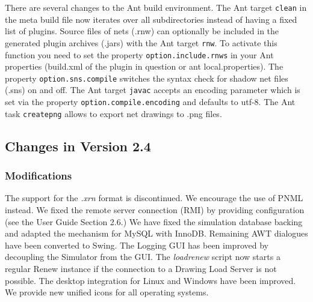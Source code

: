 There are several changes to the Ant build environment. The Ant target 
\texttt{clean} in the meta build file now iterates over
all subdirectories instead of having a fixed list of plugins. Source
files of nets (.rnw) can optionally be included in the generated
plugin archives (.jars) with the Ant target \texttt{rnw}. To activate
this function you need to set the property
\texttt{option.include.rnws} in your Ant properties (build.xml of the
plugin in question or ant local.properties). The property
\texttt{option.sns.compile} switches the syntax check for shadow net
files (.sns) on and off. The Ant target \texttt{javac} accepts an
encoding parameter which is set via the property
\texttt{option.compile.encoding} and defaults to utf-8. The Ant task
\texttt{createpng} allows to export net drawings to .png files.


\subsection{Changes in Version 2.4}

\subsubsection*{Modifications}

The support for the \emph{.xrn} format is discontinued. We encourage the use
of PNML instead.  
We fixed the remote server connection (RMI) by providing
configuration (see the User Guide Section 2.6.)  
We have fixed the
simulation database backing and adapted the mechanism for MySQL with InnoDB.  
Remaining AWT dialogues have been converted to Swing.  
The Logging GUI has been improved by decoupling the Simulator from the GUI.  
The \emph{loadrenew} script now starts a regular Renew instance if the
connection to a Drawing Load Server is not possible.  
The desktop integration for Linux and Windows have been improved. We provide new unified icons for all operating systems.

